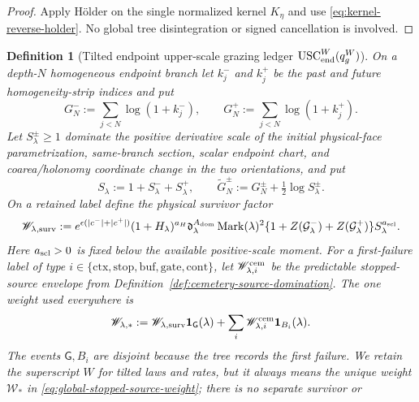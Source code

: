 \documentclass[11pt]{article}
\newtheorem{definition}[theorem]{Definition}
\newcommand{\one}{\mathbf 1}
\begin{document}
\begin{proof}
Apply H\"older on the single normalized kernel $K_\eta$ and use
\eqref{eq:kernel-reverse-holder}.  No global tree disintegration or signed
cancellation is involved.
\end{proof}

\begin{definition}[Tilted endpoint upper-scale grazing ledger
$\mathrm{USC}_{\rm end}^{W}(q_g^W)$]
\label{def:endpoint-upper-scale}
On a depth-$N$ homogeneous endpoint branch let $k_j^-$ and $k_j^+$ be the
past and future homogeneity-strip indices and put
\begin{equation}
\label{eq:homogeneity-log-marks}
 G_N^-:=\sum_{j<N}\log(1+k_j^-),\qquad
 G_N^+:=\sum_{j<N}\log(1+k_j^+).
\end{equation}
Let $S_\lambda^\pm\ge1$ dominate the positive derivative scale of the initial
physical-face parametrization, same-branch section, scalar endpoint chart,
and coarea/holonomy coordinate change in the two orientations, and put
\begin{equation}
\label{eq:augmented-homogeneity-mark}
 S_\lambda:=1+S_\lambda^-+S_\lambda^+,
 \qquad
 \widetilde G_N^\pm:=G_N^\pm+\tfrac12\log S_\lambda^\pm.
\end{equation}
On a retained label define the physical survivor factor
\begin{equation}
\label{eq:global-event-weight}
 \mathscr W_{\lambda,\rm surv}:=
 e^{\epsilon(|c^-|+|c^+|)}(1+H_\lambda)^{a_H}
 \mathfrak d_\lambda^{A_{\rm dom}}
 \operatorname{Mark}(\lambda)^2
 \{1+Z(\mathcal G_\lambda^-)+Z(\mathcal G_\lambda^+)\}
 S_\lambda^{a_{\rm scl}}.
\end{equation}
Here $a_{\rm scl}>0$ is fixed below the available positive-scale moment.
For a first-failure label of type
$i\in\{\mathrm{ctx},\mathrm{stop},\mathrm{buf},\mathrm{gate},
\mathrm{cont}\}$, let $\mathscr W_{\lambda,i}^{\rm cem}$ be the predictable
stopped-source envelope from Definition~\ref{def:cemetery-source-domination}.
The one weight used everywhere is
\begin{equation}
\label{eq:global-stopped-source-weight}
 \mathscr W_{\lambda,*}:=
 \mathscr W_{\lambda,\rm surv}\one_{\mathsf G}(\lambda)
 +\sum_i\mathscr W_{\lambda,i}^{\rm cem}\one_{B_i}(\lambda).
\end{equation}
The events $\mathsf G,B_i$ are disjoint because the tree records the first
failure.  We retain the superscript $W$ for tilted laws and rates, but it
always means the unique weight $\mathscr W_*$ in
\eqref{eq:global-stopped-source-weight}; there is no separate survivor or

\end{definition}
\end{document}
